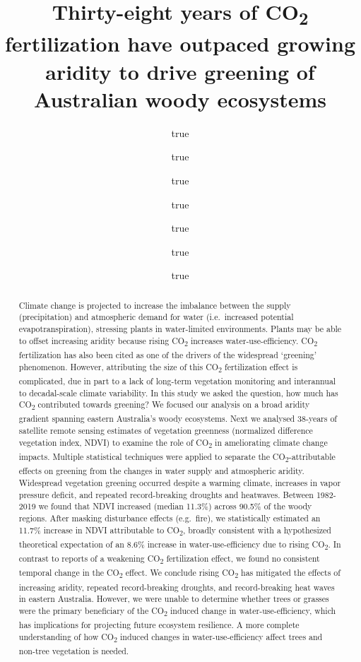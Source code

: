 \documentclass[
]{article}
\title{Thirty-eight years of CO\textsubscript{2} fertilization have
outpaced growing aridity to drive greening of Australian woody
ecosystems}
\author{true \and true \and true \and true \and true \and true \and true}
\date{}
\begin{document}
\maketitle
\begin{abstract}
Climate change is projected to increase the imbalance between the supply
(precipitation) and atmospheric demand for water (i.e.~increased
potential evapotranspiration), stressing plants in water-limited
environments. Plants may be able to offset increasing aridity because
rising CO\textsubscript{2} increases water-use-efficiency.
CO\textsubscript{2} fertilization has also been cited as one of the
drivers of the widespread `greening' phenomenon. However, attributing
the size of this CO\textsubscript{2} fertilization effect is
complicated, due in part to a lack of long-term vegetation monitoring
and interannual to decadal-scale climate variability. In this study we
asked the question, how much has CO\textsubscript{2} contributed towards
greening? We focused our analysis on a broad aridity gradient spanning
eastern Australia's woody ecosystems. Next we analysed 38-years of
satellite remote sensing estimates of vegetation greenness (normalized
difference vegetation index, NDVI) to examine the role of
CO\textsubscript{2} in ameliorating climate change impacts. Multiple
statistical techniques were applied to separate the
CO\textsubscript{2}-attributable effects on greening from the changes in
water supply and atmospheric aridity. Widespread vegetation greening
occurred despite a warming climate, increases in vapor pressure deficit,
and repeated record-breaking droughts and heatwaves. Between 1982-2019
we found that NDVI increased (median 11.3\%) across 90.5\% of the woody
regions. After masking disturbance effects (e.g.~fire), we statistically
estimated an 11.7\% increase in NDVI attributable to
CO\textsubscript{2}, broadly consistent with a hypothesized theoretical
expectation of an 8.6\% increase in water-use-efficiency due to rising
CO\textsubscript{2}. In contrast to reports of a weakening
CO\textsubscript{2} fertilization effect, we found no consistent
temporal change in the CO\textsubscript{2} effect. We conclude rising
CO\textsubscript{2} has mitigated the effects of increasing aridity,
repeated record-breaking droughts, and record-breaking heat waves in
eastern Australia. However, we were unable to determine whether trees or
grasses were the primary beneficiary of the CO\textsubscript{2} induced
change in water-use-efficiency, which has implications for projecting
future ecosystem resilience. A more complete understanding of how
CO\textsubscript{2} induced changes in water-use-efficiency affect trees
and non-tree vegetation is needed.
\end{abstract}
\end{document}
